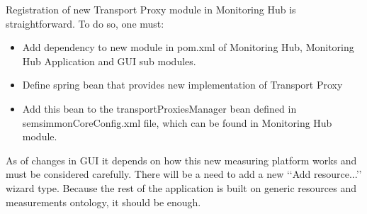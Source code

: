 Registration of new Transport Proxy module in Monitoring Hub is straightforward. To do so, one must:

\begin{itemize}

\item Add dependency to new module in pom.xml of Monitoring Hub, Monitoring Hub Application and GUI sub modules.

\item Define spring bean that provides new implementation of Transport Proxy

\item Add this bean to the transportProxiesManager bean defined in semsimmonCoreConfig.xml file, which can be found in Monitoring Hub module.

\end{itemize}

As of changes in GUI it depends on how this new measuring platform works and must be considered carefully. There will be a need to add a new \lq\lq{}Add resource...\rq\rq{} wizard type. Because the rest of the application is built on generic resources and measurements ontology, it should be enough.